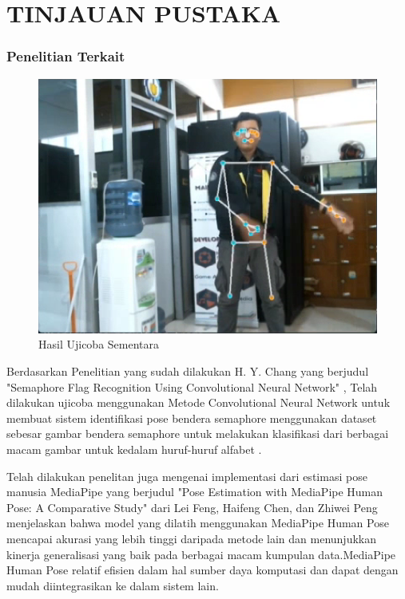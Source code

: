 \section{TINJAUAN PUSTAKA}


\subsubsection{Penelitian Terkait}
\begin{figure} [ht] \centering
    \includegraphics[scale=0.6]{gambar/contoh.png}
    \caption{Hasil Ujicoba Sementara}
    \label{fig:Ujicoba Sementara}
  \end{figure}

Berdasarkan Penelitian yang sudah dilakukan H. Y. Chang yang berjudul "Semaphore Flag Recognition Using Convolutional Neural Network" , Telah dilakukan ujicoba menggunakan Metode Convolutional Neural Network untuk membuat sistem identifikasi pose bendera semaphore menggunakan dataset sebesar gambar bendera semaphore untuk melakukan klasifikasi dari berbagai macam gambar untuk kedalam huruf-huruf alfabet . 

Telah dilakukan penelitan juga mengenai implementasi dari estimasi pose manusia MediaPipe yang berjudul "Pose Estimation with MediaPipe Human Pose: A Comparative Study" dari Lei Feng, Haifeng Chen, dan Zhiwei Peng menjelaskan bahwa model yang dilatih menggunakan MediaPipe Human Pose mencapai akurasi yang lebih tinggi daripada metode lain dan menunjukkan kinerja generalisasi yang baik pada berbagai macam kumpulan data.MediaPipe Human Pose relatif efisien dalam hal sumber daya komputasi dan dapat dengan mudah diintegrasikan ke dalam sistem lain.

